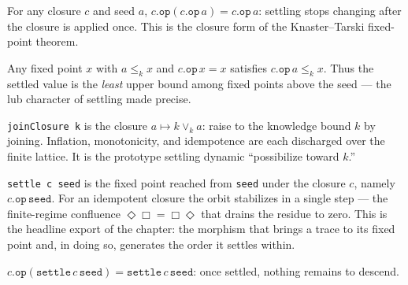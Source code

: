 \begin{theorem}\label{thm:op-fixed}\leanok{}
For any closure $c$ and seed $a$, $c.\texttt{op}(c.\texttt{op}\,a) =
c.\texttt{op}\,a$: settling stops changing after the closure is applied once.
This is the closure form of the Knaster--Tarski fixed-point theorem.
\end{theorem}

\begin{theorem}\label{thm:op-least}\leanok{}
Any fixed point $x$ with $a \le_k x$ and $c.\texttt{op}\,x = x$ satisfies
$c.\texttt{op}\,a \le_k x$. Thus the settled value is the \emph{least} upper
bound among fixed points above the seed --- the lub character of settling made
precise.
\end{theorem}

\begin{definition}\label{def:join-closure}\leanok{}
\texttt{joinClosure k} is the closure $a \mapsto k \vee_k a$: raise to the
knowledge bound $k$ by joining. Inflation, monotonicity, and idempotence are
each discharged over the finite lattice. It is the prototype settling dynamic
``possibilize toward $k$.''
\end{definition}

\begin{definition}[Settling]\label{def:settling}\leanok{}
\texttt{settle c seed} is the fixed point reached from \texttt{seed} under the
closure $c$, namely $c.\texttt{op}\,\texttt{seed}$. For an idempotent closure the
orbit stabilizes in a single step --- the finite-regime confluence
$\Diamond\Box = \Box\Diamond$ that drains the residue to zero. This is the
headline export of the chapter: the morphism that brings a trace to its fixed
point and, in doing so, generates the order it settles within.
\end{definition}

\begin{theorem}\label{thm:settle-fixed}\leanok{}
$c.\texttt{op}(\texttt{settle}\,c\,\texttt{seed}) = \texttt{settle}\,c\,\texttt{seed}$:
once settled, nothing remains to descend.
\end{theorem}

